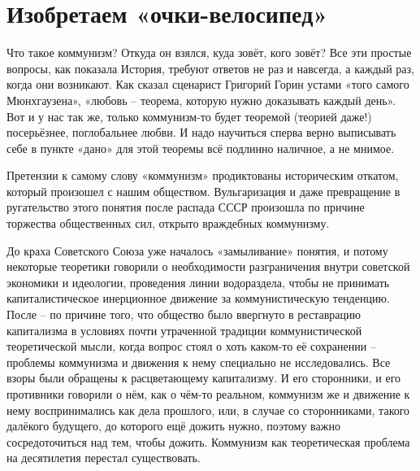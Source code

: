 \documentclass[../main]{subfiles}
\begin{document}
\ifSubfilesClassLoaded{\setcounter{page}{4}}{}
\section{Изобретаем «очки-велосипед»}
\label{sec:01_izobretaem_ochki}

Что такое коммунизм? Откуда он взялся, куда зовёт, кого зовёт? Все эти простые вопросы, как показала История, требуют ответов не раз и навсегда, а каждый раз, когда они возникают. Как сказал сценарист Григорий Горин устами «того самого Мюнхгаузена», «любовь – теорема, которую нужно доказывать каждый день». Вот и у нас так же, только коммунизм-то будет теоремой (теорией даже!) посерьёзнее, поглобальнее любви. И надо научиться сперва верно выписывать себе в пункте «дано» для этой теоремы всё подлинно наличное, а не мнимое.

Претензии к самому слову «коммунизм» продиктованы историческим откатом, который произошел с нашим обществом. Вульгаризация и даже превращение в ругательство этого понятия после распада СССР произошла по причине торжества общественных сил, открыто враждебных коммунизму.

До краха Советского Союза уже началось «замыливание» понятия, и потому некоторые теоретики говорили о необходимости разграничения внутри советской экономики и идеологии, проведения линии водораздела, чтобы не принимать капиталистическое инерционное движение за коммунистическую тенденцию. После – по причине того, что общество было ввергнуто в реставрацию капитализма в условиях почти утраченной традиции коммунистической теоретической мысли, когда вопрос стоял о хоть каком-то её сохранении – проблемы коммунизма и движения к нему специально не исследовались. Все взоры были обращены к расцветающему капитализму. И его сторонники, и его противники говорили о нём, как о чём-то реальном, коммунизм же и движение к нему воспринимались как дела прошлого, или, в случае со сторонниками, такого далёкого будущего, до которого ещё дожить нужно, поэтому важно сосредоточиться над тем, чтобы дожить. Коммунизм как теоретическая проблема на десятилетия перестал существовать.
\end{document}

